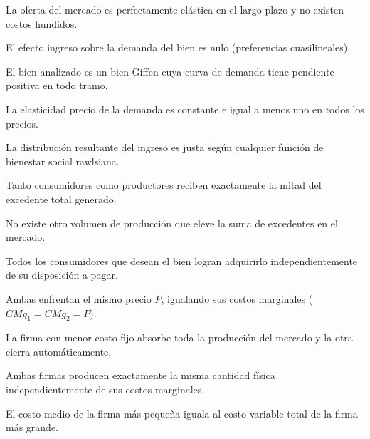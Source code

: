 \begin{opts}
    \item La oferta del mercado es perfectamente elástica en el largo plazo y no existen costos hundidos.
    \item El efecto ingreso sobre la demanda del bien es nulo (preferencias cuasilineales).
    \item El bien analizado es un bien Giffen cuya curva de demanda tiene pendiente positiva en todo tramo.
    \item La elasticidad precio de la demanda es constante e igual a menos uno en todos los precios.
\end{opts}

\begin{opts}
    \item La distribución resultante del ingreso es justa según cualquier función de bienestar social rawlsiana.
    \item Tanto consumidores como productores reciben exactamente la mitad del excedente total generado.
    \item No existe otro volumen de producción que eleve la suma de excedentes en el mercado.
    \item Todos los consumidores que desean el bien logran adquirirlo independientemente de su disposición a pagar.
\end{opts}

\begin{opts}
    \item Ambas enfrentan el mismo precio $P$, igualando sus costos marginales ($CMg_1 = CMg_2 = P$).
    \item La firma con menor costo fijo absorbe toda la producción del mercado y la otra cierra automáticamente.
    \item Ambas firmas producen exactamente la misma cantidad física independientemente de sus costos marginales.
    \item El costo medio de la firma más pequeña iguala al costo variable total de la firma más grande.
\end{opts}

